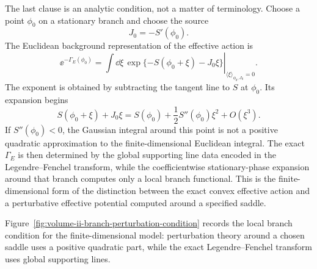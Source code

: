 The last clause is an analytic condition, not a matter of terminology.  Choose
a point \(\phi_0\) on a stationary branch and choose the source
\[
  J_0=-S'(\phi_0).
\]
The Euclidean background representation of the effective action is
\[
  \ee^{-\Gamma_E(\phi_0)}
  =
  \left.
  \int \dd\xi\,
  \exp\{-S(\phi_0+\xi)-J_0\xi\}
  \right|_{\langle\xi\rangle_{\phi_0,J_0}=0}.
\]
The exponent is obtained by subtracting the tangent line to \(S\) at
\(\phi_0\).  Its expansion begins
\[
  S(\phi_0+\xi)+J_0\xi
  =
  S(\phi_0)
  +
  \frac12 S''(\phi_0)\xi^2
  +
  O(\xi^3).
\]
If \(S''(\phi_0)<0\), the Gaussian integral around this point is not a
positive quadratic approximation to the finite-dimensional Euclidean
integral.  The exact \(\Gamma_E\) is then determined by the global supporting
line data encoded in the Legendre--Fenchel transform, while the coefficientwise
stationary-phase expansion around that branch computes only a local branch
functional.  This is the
finite-dimensional form of the distinction between the exact convex effective
action and a perturbative effective potential computed around a specified
saddle.

Figure~\ref{fig:volume-ii-branch-perturbation-condition} records the local
branch condition for the finite-dimensional model: perturbation theory around a
chosen saddle uses a positive quadratic part, while the exact
Legendre--Fenchel transform uses global supporting lines.

